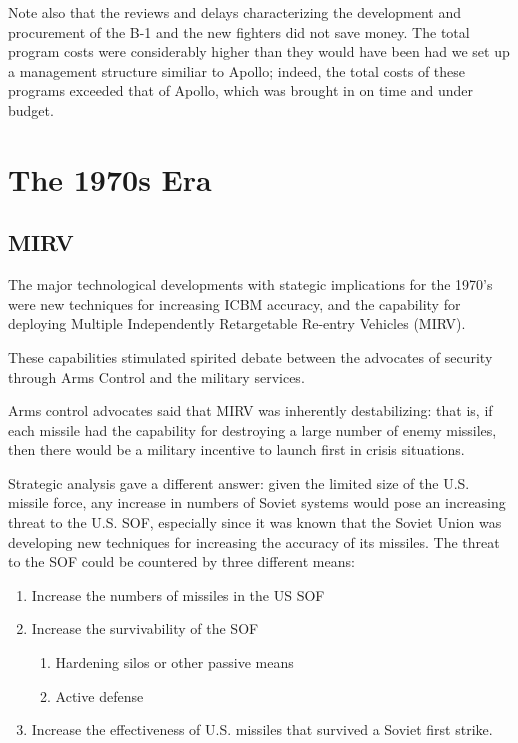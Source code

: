 \documentclass[a4paper,12pt]{book}
\begin{document}
Note also that the reviews and delays characterizing the development and procurement of the B-1 and the new fighters did not save money. The total program costs were considerably higher than they would have been had we set up a management structure similiar to Apollo; indeed, the total costs of these programs exceeded that of Apollo, which was brought in on time and under budget.

\section{The 1970s Era}
\subsection{MIRV}
The major technological developments with stategic implications for the 1970's were new techniques for increasing ICBM accuracy, and the capability for deploying Multiple Independently Retargetable Re-entry Vehicles (MIRV).

These capabilities stimulated spirited debate between the advocates of security through Arms Control and the military services.

Arms control advocates said that MIRV was inherently destabilizing: that is, if each missile had the capability for destroying a large number of enemy missiles, then there would be a military incentive to launch first in crisis situations.

Strategic analysis gave a different answer: given the limited size of the U.S. missile force, any increase in numbers of Soviet systems would pose an increasing threat to the U.S. SOF, especially since it was known that the Soviet Union was developing new techniques for increasing the accuracy of its missiles. The threat to the SOF could be countered by three different means:

\begin{enumerate}[label*=\arabic*.]
    \item Increase the numbers of missiles in the US SOF
    \item Increase the survivability of the SOF
    \begin{enumerate}[label*=\arabic*.]
        \item Hardening silos or other passive means
        \item Active defense
    \end{enumerate}
    \item Increase the effectiveness of U.S. missiles that survived a Soviet first strike.
\end{enumerate}
\end{document}
